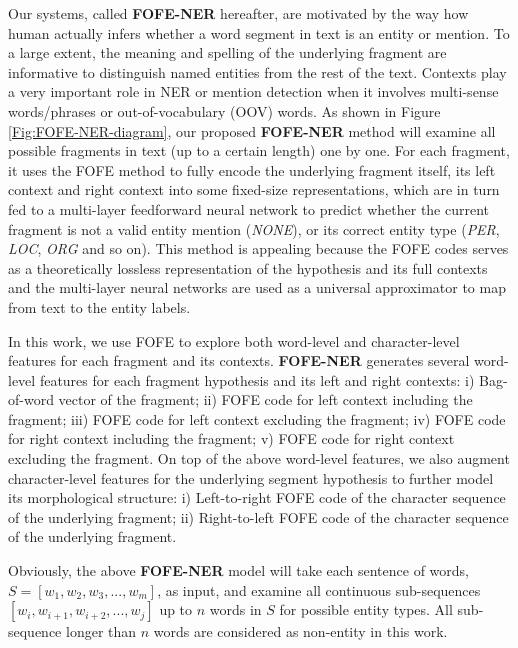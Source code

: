 \documentclass[11pt]{article}
\begin{document}
Our systems, called  \textbf{FOFE-NER} hereafter, 
are motivated by the way how human actually infers whether a word segment in text is an entity or mention. 
To a large extent, the meaning and spelling of the underlying fragment 
are informative to distinguish named entities from the rest of the text. 
Contexts play a very important role in NER or mention detection 
when it involves multi-sense words/phrases or out-of-vocabulary (OOV) words. 
As shown in Figure \ref{Fig:FOFE-NER-diagram}, our proposed \textbf{FOFE-NER} method will examine all possible fragments in text (up to a certain length) one by one. For each fragment, it uses the FOFE method to fully encode the underlying fragment itself, its left context and right context into some fixed-size representations, which are in turn fed to a multi-layer feedforward neural network to predict whether the current fragment is not a valid entity mention ({\it NONE}), or its correct entity type ({\it PER}, {\it LOC}, {\it ORG} and so on). This method is appealing because the FOFE codes serves as a theoretically lossless representation of the hypothesis and its full contexts and the multi-layer neural networks are used as a universal approximator to map from text to the entity labels. 

In this work, we use FOFE to explore both word-level and character-level features for each fragment and its contexts.
\textbf{FOFE-NER} generates several word-level features for each fragment hypothesis and its left and right contexts: 
i) Bag-of-word vector of the fragment; ii) FOFE code for left context including the fragment; iii) FOFE code for left context excluding the fragment; iv) FOFE code for right context including the fragment; v) FOFE code for right context excluding the fragment.
On top of the above word-level features, we also augment character-level features for the underlying segment hypothesis to further model its morphological structure: i) Left-to-right FOFE code of the character sequence of the underlying fragment; ii) Right-to-left FOFE code of the character sequence of the underlying fragment.

Obviously, the above \textbf{FOFE-NER} model will take each sentence of words, $S = [w_1, w_2, w_3, ..., w_m]$, as input, and examine all continuous sub-sequences $[w_i, w_{i+1}, w_{i+2}, ..., w_{j}]$ up to $n$ words in $S$ for  possible entity types. All sub-sequence longer than $n$ words are considered as non-entity in this work. 
\end{document}
